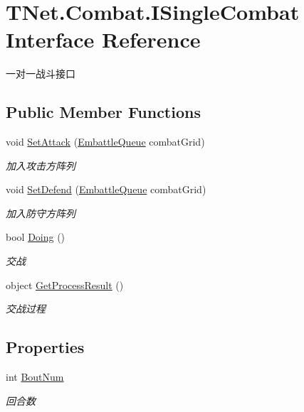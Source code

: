 \hypertarget{interface_t_net_1_1_combat_1_1_i_single_combat}{}\section{T\+Net.\+Combat.\+I\+Single\+Combat Interface Reference}
\label{interface_t_net_1_1_combat_1_1_i_single_combat}


一对一战斗接口  


\subsection*{Public Member Functions}
\begin{DoxyCompactItemize}
\item 
void \mbox{\hyperlink{interface_t_net_1_1_combat_1_1_i_single_combat_a02e8c6b12a64e732bed4c7bcf98eae0b}{Set\+Attack}} (\mbox{\hyperlink{class_t_net_1_1_model_1_1_embattle_queue}{Embattle\+Queue}} combat\+Grid)
\begin{DoxyCompactList}\small\item\em 加入攻击方阵列 \end{DoxyCompactList}\item 
void \mbox{\hyperlink{interface_t_net_1_1_combat_1_1_i_single_combat_a6e2dcd2a555712742c45e4b3808a25df}{Set\+Defend}} (\mbox{\hyperlink{class_t_net_1_1_model_1_1_embattle_queue}{Embattle\+Queue}} combat\+Grid)
\begin{DoxyCompactList}\small\item\em 加入防守方阵列 \end{DoxyCompactList}\item 
bool \mbox{\hyperlink{interface_t_net_1_1_combat_1_1_i_single_combat_a977c4ce9c7f73e1da379fbc1a3d5f00f}{Doing}} ()
\begin{DoxyCompactList}\small\item\em 交战 \end{DoxyCompactList}\item 
object \mbox{\hyperlink{interface_t_net_1_1_combat_1_1_i_single_combat_ae7ab7a80fe1d9da370449e29c4ee1657}{Get\+Process\+Result}} ()
\begin{DoxyCompactList}\small\item\em 交战过程 \end{DoxyCompactList}\end{DoxyCompactItemize}
\subsection*{Properties}
\begin{DoxyCompactItemize}
\item 
int \mbox{\hyperlink{interface_t_net_1_1_combat_1_1_i_single_combat_a8696c3f6a2760e9b672eb112c8797155}{Bout\+Num}}
\begin{DoxyCompactList}\small\item\em 回合数 \end{DoxyCompactList}\end{DoxyCompactItemize}


